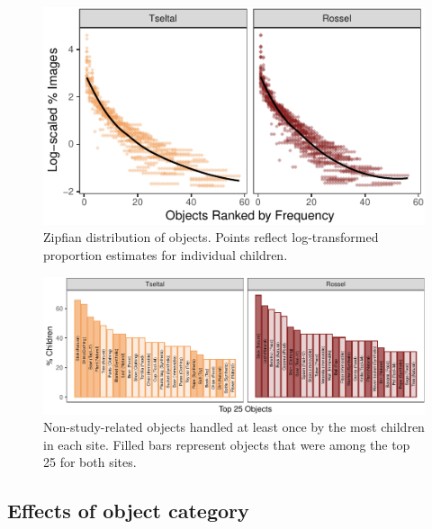 \documentclass[10pt, letterpaper]{article}
\newenvironment{CodeChunk}{}{}
\begin{document}
\begin{CodeChunk}
\begin{figure}[h]

{\centering \includegraphics{figs/zipfian-objects-fig-1} 

}

\caption[Zipfian distribution of objects]{Zipfian distribution of objects. Points reflect log-transformed proportion estimates for individual children.}\label{fig:zipfian-objects-fig}
\end{figure}
\end{CodeChunk}

\begin{CodeChunk}
\begin{figure}[!ht]

{\centering \includegraphics{figs/top-objects-fig-1} 

}

\caption[Non-study-related objects handled at least once by the most children in each site]{Non-study-related objects handled at least once by the most children in each site. Filled bars represent objects that were among the top 25 for both sites.}\label{fig:top-objects-fig}
\end{figure}
\end{CodeChunk}

\hypertarget{effects-of-object-category}{%
\subsection{Effects of object
category}\label{effects-of-object-category}}
\end{document}
